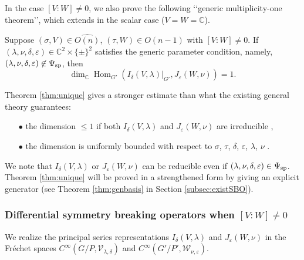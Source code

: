 In the case $[V:W]\ne 0$, 
 we also prove the following 
\lq\lq{generic multiplicity-one theorem}\rq\rq, 
which extends \cite[Thm.\ 1.1]{sbon}
 in the scalar case 
($V=W={\mathbb{C}}$).  



\begin{theorem}
\label{thm:unique}
Suppose $(\sigma, V) \in \widehat{O(n)}$, 
$(\tau,W) \in \widehat{O(n-1)}$
 with $[V:W] \ne 0$.  
If $(\lambda, \nu, \delta, \varepsilon) \in {\mathbb{C}}^2 \times \{\pm\}^2$
 satisfies the generic parameter condition, 
 namely,
 $(\lambda, \nu, \delta, \varepsilon) \not \in \Psi_{{\operatorname{sp}}}$, 
 then 
\[
\dim_{\mathbb{C}} \operatorname{Hom}_{G'}(I_{\delta}(V, \lambda)|_{G'}, J_{\varepsilon}(W, \nu))
  =1.  
\]
\end{theorem}



Theorem \ref{thm:unique} gives a stronger estimate 
 than what the existing general theory guarantees:
\begin{enumerate}
\item[$\bullet$]
the dimension $\le 1$
 if both $I_{\delta}(V, \lambda)$ and $J_{\varepsilon}(W, \nu)$ are 
irreducible \cite{SunZhu}, 
\item[$\bullet$]
the dimension is uniformly bounded 
 with respect to $\sigma$, $\tau$, 
 $\delta$, $\varepsilon$, 
 $\lambda$, $\nu$
 \cite{xKOfm}.  
\end{enumerate}
We note
 that $I_{\delta}(V,\lambda)$ or $J_{\varepsilon}(W,\nu)$
 can be reducible
 even if $(\lambda, \nu, \delta, \varepsilon) \in \Psi_{{\operatorname{sp}}}$.  
Theorem \ref{thm:unique} will be proved
 in a strengthened form by giving an explicit generator 
 (see Theorem \ref{thm:genbasis}
 in Section \ref{subsec:existSBO}).  

\subsubsection{Differential symmetry breaking operators
 when $[V:W] \ne 0$}
\label{subsec:DSBOVW}

We realize the principal series representations
 $I_{\delta}(V,\lambda)$ and $J_{\varepsilon}(W,\nu)$
 in the Fr{\'e}chet spaces
 $C^{\infty}(G/P, {\mathcal{V}}_{\lambda,\delta})$
 and 
 $C^{\infty}(G'/P', {\mathcal{W}}_{\nu,\varepsilon})$.  

